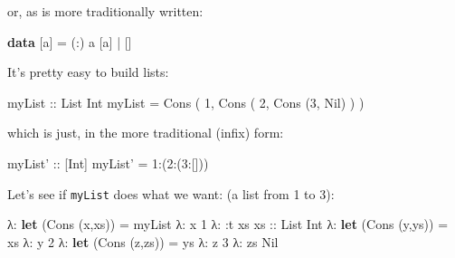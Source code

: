 \documentclass[]{article}
\newenvironment{Shaded}{}{}
\newcommand{\KeywordTok}[1]{\textcolor[rgb]{0.00,0.44,0.13}{\textbf{{#1}}}}
\newcommand{\DataTypeTok}[1]{\textcolor[rgb]{0.56,0.13,0.00}{{#1}}}
\newcommand{\DecValTok}[1]{\textcolor[rgb]{0.25,0.63,0.44}{{#1}}}
\newcommand{\OtherTok}[1]{\textcolor[rgb]{0.00,0.44,0.13}{{#1}}}
\newcommand{\FunctionTok}[1]{\textcolor[rgb]{0.02,0.16,0.49}{{#1}}}
\newcommand{\NormalTok}[1]{{#1}}
\begin{document}
or, as is more traditionally written:

\begin{Shaded}
\begin{Highlighting}[]
\KeywordTok{data} \NormalTok{[a] }\FunctionTok{=} \NormalTok{(}\FunctionTok{:}\NormalTok{) a [a] }\FunctionTok{|} \NormalTok{[]}
\end{Highlighting}
\end{Shaded}

It's pretty easy to build lists:

\begin{Shaded}
\begin{Highlighting}[]
\OtherTok{myList ::} \DataTypeTok{List} \DataTypeTok{Int}
\NormalTok{myList }\FunctionTok{=} \DataTypeTok{Cons} \NormalTok{( }\DecValTok{1}\NormalTok{, }\DataTypeTok{Cons} \NormalTok{( }\DecValTok{2}\NormalTok{, }\DataTypeTok{Cons} \NormalTok{(}\DecValTok{3}\NormalTok{, }\DataTypeTok{Nil}\NormalTok{) ) )}
\end{Highlighting}
\end{Shaded}

which is just, in the more traditional (infix) form:

\begin{Shaded}
\begin{Highlighting}[]
\OtherTok{myList' ::} \NormalTok{[}\DataTypeTok{Int}\NormalTok{]}
\NormalTok{myList' }\FunctionTok{=} \DecValTok{1}\FunctionTok{:}\NormalTok{(}\DecValTok{2}\FunctionTok{:}\NormalTok{(}\DecValTok{3}\FunctionTok{:}\NormalTok{[]))}
\end{Highlighting}
\end{Shaded}

Let's see if \texttt{myList} does what we want: (a list from 1 to 3):

\begin{Shaded}
\begin{Highlighting}[]
\NormalTok{λ}\FunctionTok{:} \KeywordTok{let} \NormalTok{(}\DataTypeTok{Cons} \NormalTok{(x,xs)) }\FunctionTok{=} \NormalTok{myList}
\NormalTok{λ}\FunctionTok{:} \NormalTok{x}
\DecValTok{1}
\NormalTok{λ}\FunctionTok{:} \FunctionTok{:}\NormalTok{t xs}
\OtherTok{xs ::} \DataTypeTok{List} \DataTypeTok{Int}
\NormalTok{λ}\FunctionTok{:} \KeywordTok{let} \NormalTok{(}\DataTypeTok{Cons} \NormalTok{(y,ys)) }\FunctionTok{=} \NormalTok{xs}
\NormalTok{λ}\FunctionTok{:} \NormalTok{y}
\DecValTok{2}
\NormalTok{λ}\FunctionTok{:} \KeywordTok{let} \NormalTok{(}\DataTypeTok{Cons} \NormalTok{(z,zs)) }\FunctionTok{=} \NormalTok{ys}
\NormalTok{λ}\FunctionTok{:} \NormalTok{z}
\DecValTok{3}
\NormalTok{λ}\FunctionTok{:} \NormalTok{zs}
\DataTypeTok{Nil}
\end{Highlighting}
\end{Shaded}
\end{document}
